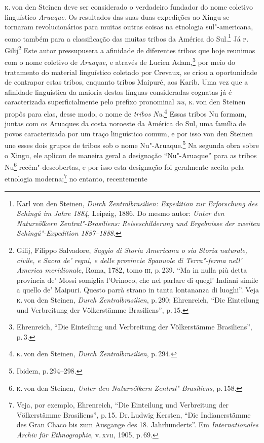 \textsc{k}.\,von den Steinen deve ser considerado o verdadeiro fundador do nome
coletivo linguístico \textit{Aruaque}. Os resultados das suas duas expedições ao
Xingu se tornaram revolucionários para muitas outras coisas na etnologia
sul"-americana, como também para a classificação das muitas tribos da
América do Sul.\footnote{Karl von den Steinen, \textit{Durch
  Zentralbrasilien: Expedition zur Erforschung des Schingú im Jahre
  1884}, Leipzig, 1886. Do mesmo autor: \textit{Unter den
  Naturvölkern Zentral"-Brasiliens: Reiseschilderung und Ergebnisse der
  zweiten Schingú"-Expedition 1887--1888}.} Já \textsc{p}.\,Gilij\footnote{Gilij,
  Filippo Salvadore, \textit{Saggio di Storia Americana o sia Storia
  naturale, civile, e Sacra de' regni, e delle provincie Spanuole di
  Terra"-ferma nell' America meridionale}, Roma, 1782, tomo \textsc{iii}, p.\,239.
  ``Ma in nulla più detta província de' Mossi somiglia l'Orinoco, che
  nel parlare di quegl' Indiani simile a quello de' Maipuri. Questo
  parrà strano in tanta lontananza di luoghi''.
  Veja \textsc{k}.\,von den Steinen, \textit{Durch Zentralbrasilien}, p.\,290;
  Ehrenreich, ``Die Einteilung und Verbreitung der Völkerstämme
  Brasiliens'', p.\,15.} Este autor pressupusera a afinidade de diferentes tribos que hoje
reunimos com o nome coletivo de \textit{Aruaque}, e através de Lucien
Adam,\footnote{Ehrenreich, ``Die Einteilung und Verbreitung der
  Völkerstämme Brasiliens'', p.\,3.} por meio do tratamento do
material linguístico coletado por Crevaux, se criou a oportunidade de
contrapor estas tribos, enquanto tribos Maipuré, aos Karib. Uma vez que
a afinidade linguística da maioria destas línguas consideradas cognatas
já é caracterizada superficialmente pelo prefixo pronominal \textit{nu}, \textsc{k.}\,von 
den Steinen propôs para elas, desse modo, o nome de \textit{tribos
Nu}.\footnote{\textsc{k}.\,von den Steinen, \textit{Durch Zentralbrasilien}, p.\,294.}
Essas tribos Nu formam, juntas com os Aruaques da costa noroeste da
América do Sul, uma família de povos caracterizada por um traço
linguístico comum, e por isso von den Steinen une esses dois grupos
de tribos sob o nome Nu"-Aruaque.\footnote{Ibidem, p.\,294--298.} Na
segunda obra sobre o Xingu, ele aplicou de maneira geral a
designação ``Nu"-Aruaque'' para as tribos Nu\footnote{\textsc{k}.\,von den
  Steinen, \textit{Unter den Naturvölkern Zentral"-Brasiliens}, p.\,158.}
recém"-descobertas, e por isso esta designação foi geralmente
aceita pela etnologia moderna;\footnote{Veja, por exemplo, Ehrenreich,
  ``Die Einteilung und Verbreitung der Völkerstämme Brasiliens'', p.\,15. Dr.\,Ludwig Kersten, ``Die Indianerstämme des Gran Chaco
  bis zum Ausgange des 18. Jahrhunderts''. Em \textit{Internationales Archiv
  für Ethnographie}, v.\,\textsc{xvii}, 1905, p.\,69.} no entanto, recentemente
